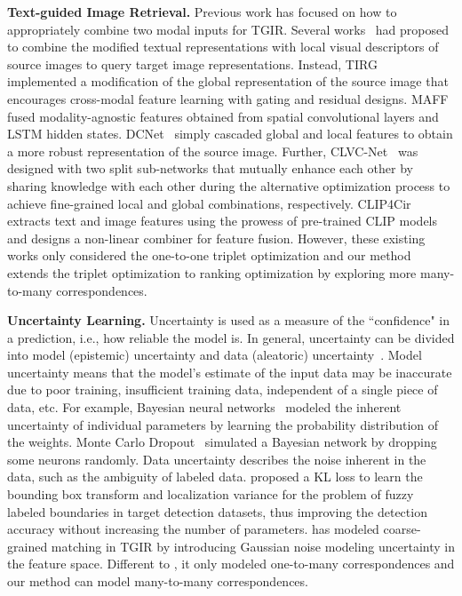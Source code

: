 \documentclass[letterpaper]{article} \usepackage{aaai24}  \usepackage{times}  \usepackage{helvet}  \usepackage{courier}  \usepackage[hyphens]{url}  \usepackage{graphicx} \urlstyle{rm} \def\UrlFont{\rm}  \usepackage{natbib}  \usepackage{caption} \frenchspacing  \setlength{\pdfpagewidth}{8.5in} \setlength{\pdfpageheight}{11in} \usepackage{amsmath,amsfonts}
\begin{document}
\textbf{Text-guided Image Retrieval.} Previous work has focused on how to appropriately combine two modal inputs for TGIR. Several works~\cite {Chen_2020_CVPR, Hosseinzadeh2020locally, zhang2020joint} had proposed to combine the modified textual representations with local visual descriptors of source images to query target image representations. Instead, TIRG~\cite{TIRG} implemented a modification of the global representation of the source image that encourages cross-modal feature learning with gating and residual designs. MAFF~\cite{dodds2020modality_maaf} fused modality-agnostic features obtained from spatial convolutional layers and LSTM hidden states. DCNet~\cite{kim:2021:AAAI} simply cascaded global and local features to obtain a more robust representation of the source image. Further, CLVC-Net~\cite{CLVC-Net} was designed with two split sub-networks that mutually enhance each other by sharing knowledge with each other during the alternative optimization process to achieve fine-grained local and global combinations, respectively. CLIP4Cir~\cite{Baldrati2022combiner} extracts text and image features using the prowess of pre-trained CLIP models and designs a non-linear combiner for feature fusion. However, these existing works only considered the one-to-one triplet optimization and our method extends the triplet optimization to ranking optimization by exploring more many-to-many correspondences. 

\textbf{Uncertainty Learning.} Uncertainty is used as a measure of the ``confidence" in a prediction, i.e., how reliable the model is. In general, uncertainty can be divided into model (epistemic) uncertainty and data (aleatoric) uncertainty~\cite{Kendall2017nips}. Model uncertainty means that the model's estimate of the input data may be inaccurate due to poor training, insufficient training data, independent of a single piece of data, etc. For example, Bayesian neural networks~\cite{Parsons2008bn, Gal2016bnn} modeled the inherent uncertainty of individual parameters by learning the probability distribution of the weights. Monte Carlo Dropout~\cite{Gal2016bnn} simulated a Bayesian network by dropping some neurons randomly. Data uncertainty describes the noise inherent in the data, such as the ambiguity of labeled data. \cite{HeZWS019cvpr} proposed a KL loss to learn the bounding box transform and localization variance for the problem of fuzzy labeled boundaries in target detection datasets, thus improving the detection accuracy without increasing the number of parameters. \cite{chen2022composed} has modeled coarse-grained matching in TGIR by introducing Gaussian noise modeling uncertainty in the feature space. Different to \cite{chen2022composed}, it only modeled one-to-many correspondences and our method can model many-to-many correspondences. 
\end{document}
